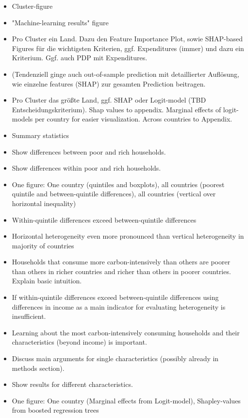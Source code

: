 \documentclass[12pt, a4paper]{article}
\begin{document}
\begin{itemize}
\item Cluster-figure
\item "Machine-learning results" figure
\item Pro Cluster ein Land. Dazu den Feature Importance Plot, sowie SHAP-based Figures für die wichtigsten Kriterien, ggf. Expenditures (immer) und dazu ein Kriterium. Ggf. auch PDP mit Expenditures.
\item (Tendenziell ginge auch out-of-sample prediction mit detaillierter Auflösung, wie einzelne features (SHAP) zur gesamten Prediction beitragen.
\item Pro Cluster das größte Land, ggf. SHAP oder Logit-model (TBD Entscheidungskriterium). Shap values to appendix. Marginal effects of logit-models per country for easier visualization. Across countries to Appendix.
  \item Summary statistics
  \item Show differences between poor and rich households.
  \item Show differences within poor and rich households.
  \item One figure: One country (quintiles and boxplots), all countries (poorest quintile and between-quintile differences), all countries (vertical over horizontal inequality)
  \item Within-quintile differences exceed between-quintile differences
  \item Horizontal heterogeneity even more pronounced than vertical heterogeneity in majority of countries
  \item Households that consume more carbon-intensively than others are poorer than others in richer countries and richer than others in poorer countries. Explain basic intuition.
  \item If within-quintile differences exceed between-quintile differences using differences in income as a main indicator for evaluating heterogeneity is insufficient.
  \item Learning about the most carbon-intensively consuming households and their characteristics (beyond income) is important.
  \item Discuss main arguments for single characteristics (possibly already in methods section).
  \item Show results for different characteristics.
  \item One figure: One country (Marginal effects from Logit-model), Shapley-values from boosted regression trees

\end{itemize}
\end{document}
